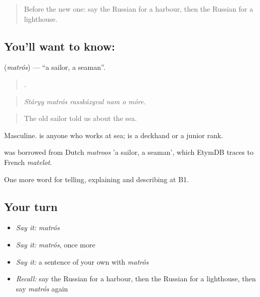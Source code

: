 \label{lesson:RU-C427-matros}



\begin{quote}
Before the new one: say the Russian for a harbour, then the Russian for a lighthouse.
\end{quote}

\subsection*{You'll want to know: }
\textbf{} (\emph{matrós}) — \textquotedblleft{}a sailor, a seaman\textquotedblright{}.

\begin{quote}
     .
\end{quote}

\begin{quote}
\emph{Stáryy matrós rasskázyval nam o móre.}
\end{quote}

\begin{quote}
The old sailor told us about the sea.
\end{quote}

Masculine. \emph{} is anyone who works at sea; \emph{} is a deckhand or a junior rank.

\begin{cousinweb}
\emph{} was borrowed from Dutch \emph{matroos} 'a sailor, a seaman', which EtymDB traces to French \emph{matelot}.
\end{cousinweb}

\begin{grammarlens}[title={What you've built}]
One more word for telling, explaining and describing at B1.
\end{grammarlens}

\subsection*{Your turn}
\begin{itemize}
\raggedright
  \item \emph{Say it:} \emph{matrós}
  \item \emph{Say it:} \emph{matrós}, once more
  \item \emph{Say it:} a sentence of your own with \emph{matrós}
  \item \emph{Recall:} say the Russian for a harbour, then the Russian for a lighthouse, then say \emph{matrós} again
\end{itemize}

